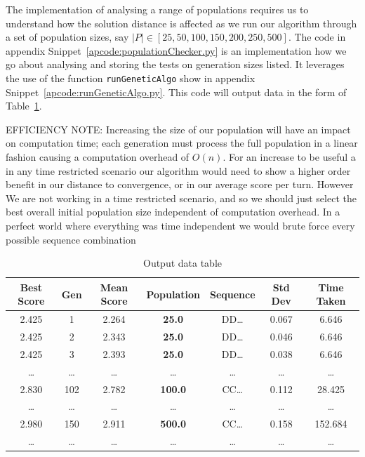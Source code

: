 The implementation of analysing a range of populations requires us to understand how the solution distance is affected as we run our algorithm through a set of population sizes, say \(|P| \in [25,50,100,150,200,250,500]\).
The code in appendix Snippet~\ref{apcode:populationChecker.py} is an implementation how we go about analysing and storing the tests on generation sizes listed.
It leverages the use of the function \texttt{runGeneticAlgo} show in appendix Snippet~\ref{apcode:runGeneticAlgo.py}.
This code will output data in the form of Table~\ref{table:popCheckerDataTable}.

EFFICIENCY NOTE\@: Increasing the size of our population will have an impact on computation time;
each generation must process the full population in a linear fashion causing a computation overhead of \(O(n)\).
For an increase to be useful a in any time restricted scenario our algorithm would need to show a higher order benefit in our distance to convergence, or in our average score per turn.
However We are not working in a time restricted scenario, and so we should just select the best overall initial population size independent of computation overhead.
In a perfect world where everything was time independent we would brute force every possible sequence combination

\begin{table}
    \centering
    \begin{tabular}{ccccccc}
        \toprule
        Best Score & Gen & Mean Score & Population & Sequence & Std Dev & Time Taken \\
        \midrule
        2.425 & 1 & 2.264 & \textbf{25.0} & DD\ldots & 0.067 & 6.646\\
        2.425 & 2 & 2.343 & \textbf{25.0} & DD\ldots & 0.046 & 6.646\\
        2.425 & 3 & 2.393 & \textbf{25.0} & DD\ldots & 0.038 & 6.646\\
        \ldots  & \ldots  & \ldots  & \ldots  & \ldots  & \ldots  & \ldots \\
        2.830 & 102 & 2.782 & \textbf{100.0} & CC\ldots & 0.112 & 28.425\\
        \ldots  & \ldots  & \ldots  & \ldots  & \ldots  & \ldots  & \ldots \\
        2.980 & 150 & 2.911 & \textbf{500.0} & CC\ldots & 0.158 & 152.684\\
        \ldots  & \ldots  & \ldots  & \ldots  & \ldots  & \ldots  & \ldots \\
        \bottomrule
    \end{tabular}
    \caption{Output data table}\label{table:popCheckerDataTable}
\end{table}


